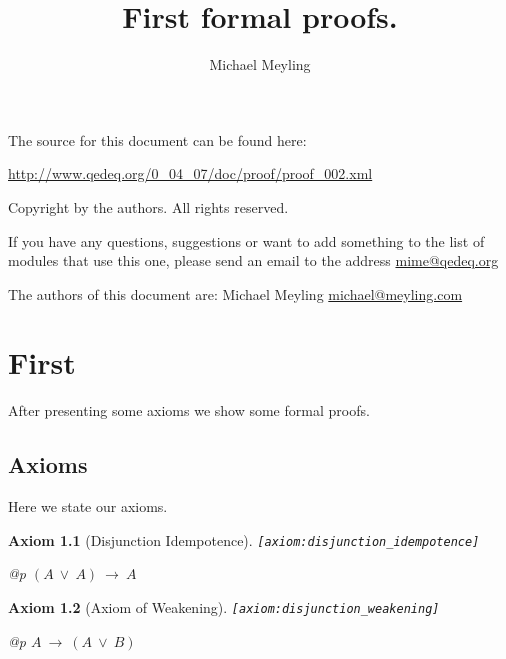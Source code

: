 \documentclass[a4paper,german,10pt,twoside]{book}
\title{First formal proofs.}
\author{
Michael Meyling
}
\newtheorem{ax}{Axiom}
\theoremstyle{definition}
\theoremstyle{remark}
\begin{document}
\maketitle

\setlength{\parskip}{5pt plus 2pt minus 1pt}
\mbox{}
\vfill

\par
The source for this document can be found here:
\par
\url{http://www.qedeq.org/0_04_07/doc/proof/proof_002.xml}

\par
Copyright by the authors. All rights reserved.
\par
If you have any questions, suggestions or want to add something to the list of modules that use this one, please send an email to the address \href{mailto:mime@qedeq.org}{mime@qedeq.org}

\par
The authors of this document are:
Michael Meyling \href{mailto:michael@meyling.com}{michael@meyling.com}



\setlength{\parskip}{0pt}
\tableofcontents

\setlength{\parskip}{5pt plus 2pt minus 1pt}

\chapter{First} \label{chapter1} \hypertarget{chapter1}{}

After presenting some axioms we show some formal proofs.

\section{Axioms} \label{chapter1_section1} \hypertarget{chapter1_section1}{}
Here we state our axioms.

\begin{ax}[Disjunction Idempotence]
\label{axiom:disjunction_idempotence} \hypertarget{axiom:disjunction_idempotence}{}
{\tt \tiny [\verb]axiom:disjunction_idempotence]]}
\mbox{}
\begin{longtable}{{@{\extracolsep{\fill}}p{\linewidth}}}
\centering $(A\ \lor\ A)\ \rightarrow\ A$
\end{longtable}

\end{ax}


\begin{ax}[Axiom of Weakening]
\label{axiom:disjunction_weakening} \hypertarget{axiom:disjunction_weakening}{}
{\tt \tiny [\verb]axiom:disjunction_weakening]]}
\mbox{}
\begin{longtable}{{@{\extracolsep{\fill}}p{\linewidth}}}
\centering $A\ \rightarrow\ (A\ \lor\ B)$
\end{longtable}

\end{ax}
\end{document}
